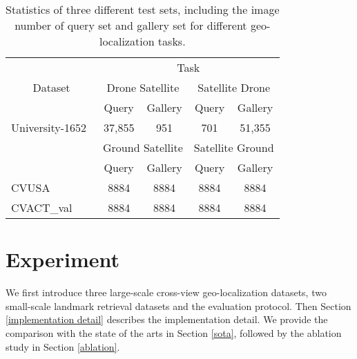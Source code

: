 \documentclass[journal]{IEEEtran}
\begin{document}
\setlength{\tabcolsep}{5pt}
\begin{table}[htb]
\small
\caption{
Statistics of three different test sets, including the image number of query set and gallery set for different geo-localization tasks.
}
\begin{center}
\begin{tabular}{l|cc|cc}
\hline
\multicolumn{1}{c|}{\multirow{3}{*}{Dataset}} & \multicolumn{4}{c}{Task} \\
\cline{2-5}
& \multicolumn{2}{c|}{Drone  Satellite} & \multicolumn{2}{c}{Satellite  Drone}\\
& Query & Gallery & Query & Gallery \\
\shline
University-1652~\cite{zheng_university-1652_nodate} & 37,855 & 951 & 701 & 51,355 \\
\hline
\cline{2-5}
& \multicolumn{2}{c|}{Ground  Satellite} & \multicolumn{2}{c}{Satellite  Ground}\\
& Query & Gallery & Query & Gallery \\
\shline
CVUSA~\cite{zhai_predicting_2017} & 8884 & 8884 & 8884 & 8884 \\
CVACT\_val~\cite{liu_lending_2019} & 8884 & 8884 & 8884 & 8884 \\
\hline
\end{tabular}
\end{center}
\label{table:statistic}
\end{table}

\section{Experiment}\label{experiment}
We first introduce three large-scale cross-view geo-localization datasets, two small-scale landmark retrieval datasets and the evaluation protocol. Then Section \ref{implementation detail} describes the implementation detail. We provide the comparison with the state of the arts in Section \ref{sota}, followed by the ablation study in Section \ref{ablation}.
\end{document}
